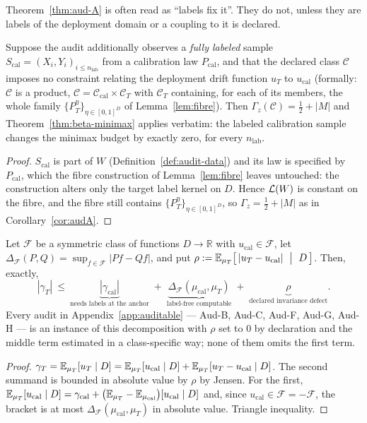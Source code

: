 Theorem~\ref{thm:aud-A} is often read as ``labels fix it''. They do not, unless they are
labels of the deployment domain or a coupling to it is declared.

\begin{theorem}\label{thm:anchor}
Suppose the audit additionally observes a \emph{fully labeled} sample
$S_{\mathrm{cal}}=(X_i,Y_i)_{i\le n_{\mathrm{lab}}}$ from a calibration law
$P_{\mathrm{cal}}$, and that the declared class $\mathcal C$ imposes no constraint relating
the deployment drift function $u_T$ to $u_{\mathrm{cal}}$ (formally: $\mathcal C$ is a product,
$\mathcal C=\mathcal C_{\mathrm{cal}}\times\mathcal C_T$ with $\mathcal C_T$ containing, for
each of its members, the whole family $\{P_T^\eta\}_{\eta\in[0,1]^D}$ of
Lemma~\ref{lem:fibre}). Then $\Gamma_z(\mathcal C)=\tfrac12+|M|$ and
Theorem~\ref{thm:beta-minimax} applies verbatim: the labeled calibration sample changes the
minimax budget by exactly zero, for every $n_{\mathrm{lab}}$.
\end{theorem}
\begin{proof}
$S_{\mathrm{cal}}$ is part of $W$ (Definition~\ref{def:audit-data}) and its law is specified
by $P_{\mathrm{cal}}$, which the fibre construction of Lemma~\ref{lem:fibre} leaves
untouched: the construction alters only the target label kernel on $D$. Hence
$\mathcal{L}(W)$ is constant on the fibre, and the fibre still contains
$\{P_T^\eta\}_{\eta\in[0,1]^D}$, so $\Gamma_z=\tfrac12+|M|$ as in
Corollary~\ref{cor:audA}.
\end{proof}

\begin{proposition}\label{prop:threeterm}
Let $\mathcal F$ be a symmetric class of functions $D\to\mathbb R$ with
$u_{\mathrm{cal}}\in\mathcal F$, let
$\Delta_{\mathcal F}(P,Q)=\sup_{f\in\mathcal F}|Pf-Qf|$, and put
$\rho:=\E_{\mu_T}\bigl[\,|u_T-u_{\mathrm{cal}}|\ \bigm|\ D\,\bigr]$. Then, exactly,
\[
|\gamma_T|\ \le\ \underbrace{|\gamma_{\mathrm{cal}}|}_{\text{needs labels at the anchor}}
\;+\;\underbrace{\Delta_{\mathcal F}(\mu_{\mathrm{cal}},\mu_T)}_{\text{label-free computable}}
\;+\;\underbrace{\rho}_{\text{declared invariance defect}} .
\]
Every audit in Appendix~\ref{app:auditable} --- Aud-B, Aud-C, Aud-F, Aud-G, Aud-H --- is an
instance of this decomposition with $\rho$ set to $0$ by declaration and the middle term
estimated in a class-specific way; none of them omits the first term.
\end{proposition}
\begin{proof}
$\gamma_T=\mathbb{E}_{\mu_T}[u_T\mid D]
=\mathbb{E}_{\mu_T}[u_{\mathrm{cal}}\mid D]+\mathbb{E}_{\mu_T}[u_T-u_{\mathrm{cal}}\mid D]$.
The second summand is bounded in absolute value by $\rho$ by Jensen. For the first,
$\mathbb{E}_{\mu_T}[u_{\mathrm{cal}}\mid D]
=\gamma_{\mathrm{cal}}+\bigl(\mathbb{E}_{\mu_T}-\mathbb{E}_{\mu_{\mathrm{cal}}}\bigr)[u_{\mathrm{cal}}\mid D]$
and, since $u_{\mathrm{cal}}\in\mathcal F=-\mathcal F$, the bracket is at most
$\Delta_{\mathcal F}(\mu_{\mathrm{cal}},\mu_T)$ in absolute value. Triangle inequality.
\end{proof}

